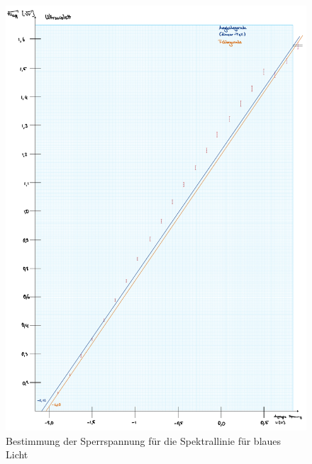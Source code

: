 \begin{figure}[t!]
    \includegraphics[width=1\textwidth, page=3]{img/35/v35-Farbplots.pdf}
    \caption{Bestimmung der Sperrspannung für die Spektrallinie für blaues Licht}
    \label{fig:b}
\end{figure}

\newpage

